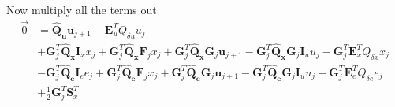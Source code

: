 \documentclass[landscape]{article}
\begin{document}
Now multiply all the terms out
\begin{align}
\vec{0}
& =  \mathbf{\hat{Q}_u} \mathbf{u}_{j+1} -  \mathbf{E}_u^T Q_{\delta u} u_j\\
& 
+ \mathbf{G}_j^T \mathbf{\hat{Q}_x} \mathbf{I}_x x_j 
+ \mathbf{G}_j^T \mathbf{\hat{Q}_x} \mathbf{F}_j x_j 
+ \mathbf{G}_j^T \mathbf{\hat{Q}_x} \mathbf{G}_j \mathbf{u}_{j+1} 
- \mathbf{G}_j^T \mathbf{\hat{Q}_x} \mathbf{G}_j \mathbf{I}_u u_j  
- \mathbf{G}_j^T \mathbf{E}_x^T Q_{\delta x} x_j\\
& 
- \mathbf{G}_j^T \mathbf{\hat{Q}_e} \mathbf{I}_e e_j 
+ \mathbf{G}_j^T \mathbf{\hat{Q}_e} \mathbf{F}_j x_j 
+ \mathbf{G}_j^T \mathbf{\hat{Q}_e} \mathbf{G}_j \mathbf{u}_{j+1} 
- \mathbf{G}_j^T \mathbf{\hat{Q}_e} \mathbf{G}_j \mathbf{I}_u u_j 
+ \mathbf{G}_j^T \mathbf{E}_e^T Q_{\delta e} e_j\\
& + \frac{1}{2} \mathbf{G}_j^T \mathbf{S}_x^T
\end{align}
\end{document}
